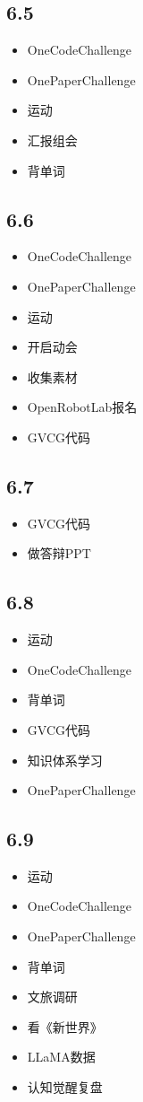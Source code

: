 \documentclass[UTF8]{ctexart}
\begin{document}
\subsection*{6.5}
\begin{itemize}
    \item OneCodeChallenge
    \item OnePaperChallenge
    \item 运动
    \item 汇报组会
    \item 背单词
\end{itemize}

\subsection*{6.6}
\begin{itemize}
    \item OneCodeChallenge
    \item OnePaperChallenge
    \item 运动
    \item 开启动会
    \item 收集素材
    \item OpenRobotLab报名
    \item GVCG代码
\end{itemize}

\subsection*{6.7}
\begin{itemize}
    \item GVCG代码
    \item 做答辩PPT
\end{itemize}

\subsection*{6.8}
\begin{itemize}
    \item 运动
    \item OneCodeChallenge
    \item 背单词
    \item GVCG代码
    \item 知识体系学习
    \item OnePaperChallenge
\end{itemize}

\subsection*{6.9}
\begin{itemize}
    \item 运动
    \item OneCodeChallenge
    \item OnePaperChallenge
    \item 背单词
    \item 文旅调研
    \item 看《新世界》
    \item LLaMA数据
    \item 认知觉醒复盘
\end{itemize}
\end{document}
